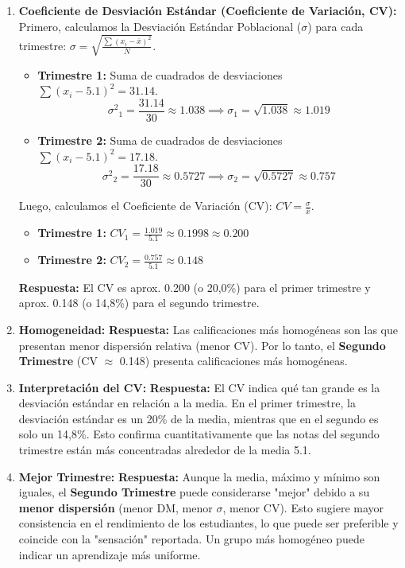 \documentclass[12pt, a4paper]{article} %
\newcommand{\mean}[1]{\ensuremath{\bar{#1}}} %
\newcommand{\pstdev}{\ensuremath{\sigma}} %
\newcommand{\pvar}{\ensuremath{\sigma^2}} %
\begin{document}
\begin{enumerate}
    \item \textbf{Coeficiente de Desviación Estándar (Coeficiente de Variación, CV):}
    Primero, calculamos la Desviación Estándar Poblacional (\pstdev) para cada trimestre: $\pstdev = \sqrt{\frac{\sum (x_i - \mean{x})^2}{N}}$.
    \begin{itemize}[nosep]
        \item \textbf{Trimestre 1:} Suma de cuadrados de desviaciones $\sum (x_i - \num{5,1})^2 = \num{31,14}$.
          \[ \pvar_1 = \frac{\num{31,14}}{30} \approx \num{1,038} \implies \pstdev_1 = \sqrt{\num{1,038}} \approx \num{1,019} \]
        \item \textbf{Trimestre 2:} Suma de cuadrados de desviaciones $\sum (x_i - \num{5,1})^2 = \num{17,18}$.
          \[ \pvar_2 = \frac{\num{17,18}}{30} \approx \num{0,5727} \implies \pstdev_2 = \sqrt{\num{0,5727}} \approx \num{0,757} \]
    \end{itemize}
    Luego, calculamos el Coeficiente de Variación (CV): $CV = \frac{\pstdev}{\mean{x}}$.
    \begin{itemize}[nosep]
        \item \textbf{Trimestre 1:} $CV_1 = \frac{\num{1,019}}{\num{5,1}} \approx \num{0,1998} \approx \num{0,200}$
        \item \textbf{Trimestre 2:} $CV_2 = \frac{\num{0,757}}{\num{5,1}} \approx \num{0,148}$
    \end{itemize}
    \textbf{Respuesta:} El CV es aprox. \num{0,200} (o 20,0\%) para el primer trimestre y aprox. \num{0,148} (o 14,8\%) para el segundo trimestre.

    \item \textbf{Homogeneidad:}
    \textbf{Respuesta:} Las calificaciones más homogéneas son las que presentan menor dispersión relativa (menor CV). Por lo tanto, el \textbf{Segundo Trimestre} (CV $\approx$ \num{0,148}) presenta calificaciones más homogéneas.

    \item \textbf{Interpretación del CV:}
    \textbf{Respuesta:} El CV indica qué tan grande es la desviación estándar en relación a la media. En el primer trimestre, la desviación estándar es un 20\% de la media, mientras que en el segundo es solo un 14,8\%. Esto confirma cuantitativamente que las notas del segundo trimestre están más concentradas alrededor de la media \num{5,1}.

    \item \textbf{Mejor Trimestre:}
    \textbf{Respuesta:} Aunque la media, máximo y mínimo son iguales, el \textbf{Segundo Trimestre} puede considerarse "mejor" debido a su \textbf{menor dispersión} (menor DM, menor \pstdev, menor CV). Esto sugiere mayor consistencia en el rendimiento de los estudiantes, lo que puede ser preferible y coincide con la "sensación" reportada. Un grupo más homogéneo puede indicar un aprendizaje más uniforme.


\end{enumerate}
\end{document}

